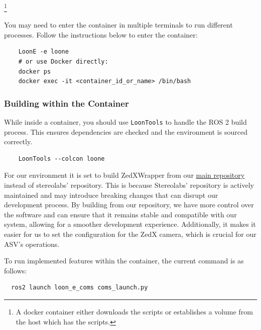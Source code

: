 \footnote{A docker container either downloads the scripts or establishes a volume from the host which has the scripts.}


You may need to enter the container in multiple terminals to run different processes. 
Follow the instructions below to enter the container:

\begin{verbatim}
    LoonE -e loone
    # or use Docker directly:
    docker ps
    docker exec -it <container_id_or_name> /bin/bash
\end{verbatim}

\subsubsection{Building within the Container}
While inside a container, you should use \texttt{LoonTools} to handle the ROS 2 build process. This ensures dependencies are checked and the environment is sourced correctly.

\begin{verbatim}
    LoonTools --colcon loone
\end{verbatim}

For our environment it is set to build ZedXWrapper from our \href{https://github.com/HumberASV/zed-ros2-wrapper}{main repository} instead of stereolabs' repository.
This is because Stereolabs' repository is actively maintained and may introduce breaking changes that can disrupt our development process.
By building from our repository, we have more control over the software and can ensure that it remains stable and compatible with our system, allowing for a smoother development experience.
Additionally, it makes it easier for us to set the configuration for the ZedX camera, which is crucial for our ASV's operations.

To run implemented features within the container, the current command is as follows:
\begin{verbatim}
  ros2 launch loon_e_coms coms_launch.py
\end{verbatim}

